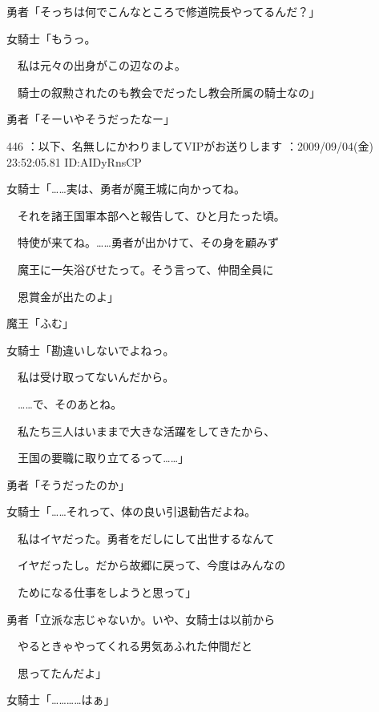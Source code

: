 \documentclass[a4j,twocolumn]{tarticle}
\begin{document}
勇者「そっちは何でこんなところで修道院長やってるんだ？」 



女騎士「もうっ。\par{} 
　私は元々の出身がこの辺なのよ。\par{} 
　騎士の叙勲されたのも教会でだったし教会所属の騎士なの」 



勇者「そーいやそうだったなー」 

	
    
    

446 ：以下、名無しにかわりましてVIPがお送りします ：2009/09/04(金) 23:52:05.81 ID:AIDyRnsCP 


女騎士「……実は、勇者が魔王城に向かってね。\par{} 
　それを諸王国軍本部へと報告して、ひと月たった頃。\par{} 
　特使が来てね。……勇者が出かけて、その身を顧みず\par{} 
　魔王に一矢浴びせたって。そう言って、仲間全員に\par{} 
　恩賞金が出たのよ」 



魔王「ふむ」 



女騎士「勘違いしないでよねっ。\par{} 
　私は受け取ってないんだから。\par{} 
　……で、そのあとね。\par{} 
　私たち三人はいままで大きな活躍をしてきたから、\par{} 
　王国の要職に取り立てるって……」 



勇者「そうだったのか」 



女騎士「……それって、体の良い引退勧告だよね。\par{} 
　私はイヤだった。勇者をだしにして出世するなんて\par{} 
　イヤだったし。だから故郷に戻って、今度はみんなの\par{} 
　ためになる仕事をしようと思って」 



勇者「立派な志じゃないか。いや、女騎士は以前から\par{} 
　やるときゃやってくれる男気あふれた仲間だと\par{} 
　思ってたんだよ」 



女騎士「…………はぁ」 
\end{document}

